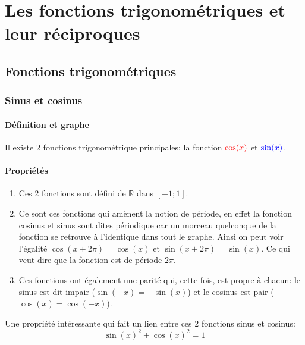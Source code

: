 \documentclass[12pt,a4paper]{report}
\begin{document}
	
	\chapter[Analyse]{Les fonctions trigonométriques et leur réciproques}
	\section*{Fonctions trigonométriques}
	\subsection*{Sinus et cosinus}
	\subsubsection*{Définition et graphe}
	Il existe 2 fonctions trigonométrique principales: la fonction $\color{red}\cos(x)$ et $\color{blue}\sin(x)$.
	
	
	
	\subsubsection*{Propriétés}	
	\begin{enumerate}
	\item Ces 2 fonctions sont défini de $\mathbb{R}$ dans $[-1;1]$.
	\item Ce sont ces fonctions qui amènent la notion de période, en effet la fonction cosinus et sinus sont dites périodique car un morceau quelconque de la fonction se retrouve à l'identique dans tout le graphe. Ainsi on peut voir l'égalité $\cos(x+2\pi)=\cos(x)$ et $\sin(x+2\pi)=\sin(x)$. Ce qui veut dire que la fonction est de période $2\pi$.
	\item Ces fonctions ont également une parité qui, cette fois, est propre à chacun: le sinus est dit impair ($\sin(-x)=-\sin(x)$) et le cosinus est pair ($\cos(x)=\cos(-x)$).
	\end{enumerate}
	Une propriété intéressante qui fait un lien entre ces 2 fonctions sinus et cosinus: \[\sin(x)^2+\cos(x)^2=1\]
	
\end{document}
